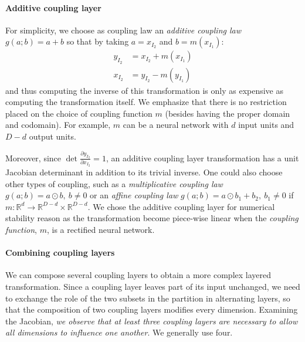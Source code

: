 \documentclass{article}
\def\R{{\mathbb{R}}}
\begin{document}
\paragraph*{Additive coupling layer}
For simplicity, we choose as coupling law an
\textit{additive coupling law} $g(a ; b) = a + b$ so that by taking
$a = x_{I_{2}}$ and $b = m(x_{I_{1}})$:
\begin{align*}
y_{I_{2}} &= x_{I_{2}} + m(x_{I_{1}}) \\
x_{I_{2}} &= y_{I_{2}} - m(y_{I_{1}})
\end{align*}
and thus computing the inverse of this
transformation is only as expensive as computing the transformation itself.
We emphasize that there is no restriction placed on the choice of coupling function $m$ (besides having the proper domain and codomain).
For example, $m$ can be a neural network with $d$ input units and $D - d$ output units.



Moreover, since $\det \frac{\partial y_{I_{2}}}{\partial x_{I_{2}}} = 1$, an 
additive coupling layer transformation has a unit Jacobian
determinant in addition to its trivial inverse. One could also
choose other types of coupling, such as a
\textit{multiplicative coupling law} $g(a ; b) = a \odot b,~b \neq 0$ or an
\textit{affine coupling law} $g(a ; b) = a \odot b_{1} + b_{2},~b_{1} \neq 0$ if 
$m: \R^{d} \rightarrow \R^{D-d} \times \R^{D-d}$. We chose the
additive coupling layer for numerical stability reason as the transformation
become piece-wise linear when the {\em coupling function}, $m$, is a rectified
neural network.

\paragraph*{Combining coupling layers}
We can compose several coupling layers to obtain a more complex
layered transformation.
Since a coupling layer leaves part of its input unchanged, we need to
exchange the role of
the two subsets in the partition in alternating layers, so that the composition of two coupling layers 
modifies every dimension. Examining the Jacobian, {\em we observe that at least three coupling
layers are necessary to allow all dimensions to influence one another}. We generally use four.
\end{document}
